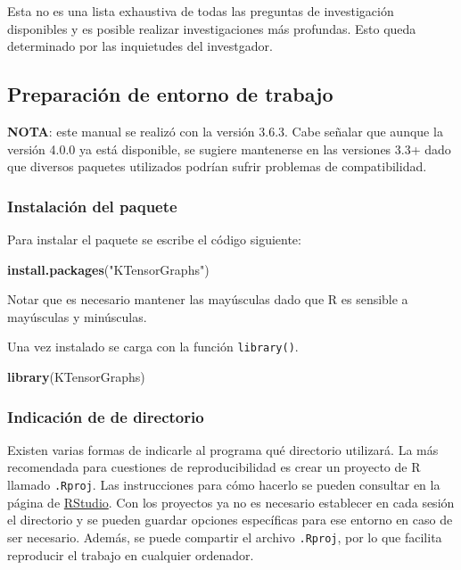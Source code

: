 \documentclass[
  spanish,
]{article}
\newenvironment{Shaded}{\begin{snugshade}}{\end{snugshade}}
\newcommand{\KeywordTok}[1]{\textcolor[rgb]{0.13,0.29,0.53}{\textbf{#1}}}
\newcommand{\NormalTok}[1]{#1}
\newcommand{\StringTok}[1]{\textcolor[rgb]{0.31,0.60,0.02}{#1}}
\begin{document}
Esta no es una lista exhaustiva de todas las preguntas de investigación disponibles y es posible realizar investigaciones más profundas. Esto queda determinado por las inquietudes del investgador.

\hypertarget{preparaciuxf3n-de-entorno-de-trabajo}{%
\subsection{Preparación de entorno de trabajo}\label{preparaciuxf3n-de-entorno-de-trabajo}}

\textbf{NOTA}: este manual se realizó con la versión 3.6.3. Cabe señalar que aunque la versión 4.0.0 ya está disponible, se sugiere mantenerse en las versiones 3.3+ dado que diversos paquetes utilizados podrían sufrir problemas de compatibilidad.

\hypertarget{instalaciuxf3n-del-paquete}{%
\subsubsection{Instalación del paquete}\label{instalaciuxf3n-del-paquete}}

Para instalar el paquete se escribe el código siguiente:

\begin{Shaded}
\begin{Highlighting}[]
\KeywordTok{install.packages}\NormalTok{(}\StringTok{"KTensorGraphs"}\NormalTok{)}
\end{Highlighting}
\end{Shaded}

Notar que es necesario mantener las mayúsculas dado que R es sensible a mayúsculas y minúsculas.

Una vez instalado se carga con la función \texttt{library()}.

\begin{Shaded}
\begin{Highlighting}[]
\KeywordTok{library}\NormalTok{(KTensorGraphs)}
\end{Highlighting}
\end{Shaded}

\hypertarget{indicaciuxf3n-de-de-directorio}{%
\subsubsection{Indicación de de directorio}\label{indicaciuxf3n-de-de-directorio}}

Existen varias formas de indicarle al programa qué directorio utilizará. La más recomendada para cuestiones de reproducibilidad es crear un proyecto de R llamado \texttt{.Rproj}. Las instrucciones para cómo hacerlo se pueden consultar en la página de \href{https://support.rstudio.com/hc/en-us/articles/200526207-Using-Projects}{RStudio}. Con los proyectos ya no es necesario establecer en cada sesión el directorio y se pueden guardar opciones específicas para ese entorno en caso de ser necesario. Además, se puede compartir el archivo \texttt{.Rproj}, por lo que facilita reproducir el trabajo en cualquier ordenador.
\end{document}
